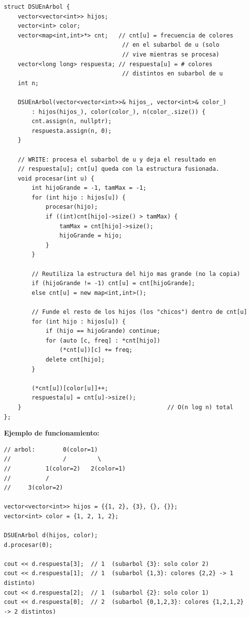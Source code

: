\documentclass[10pt,a4paper,twocolumn]{article}
\begin{document}
\begin{lstlisting}[style=cpp]
struct DSUEnArbol {
    vector<vector<int>> hijos;
    vector<int> color;
    vector<map<int,int>*> cnt;   // cnt[u] = frecuencia de colores
                                  // en el subarbol de u (solo
                                  // vive mientras se procesa)
    vector<long long> respuesta; // respuesta[u] = # colores
                                  // distintos en subarbol de u
    int n;

    DSUEnArbol(vector<vector<int>>& hijos_, vector<int>& color_)
        : hijos(hijos_), color(color_), n(color_.size()) {
        cnt.assign(n, nullptr);
        respuesta.assign(n, 0);
    }

    // WRITE: procesa el subarbol de u y deja el resultado en
    // respuesta[u]; cnt[u] queda con la estructura fusionada.
    void procesar(int u) {
        int hijoGrande = -1, tamMax = -1;
        for (int hijo : hijos[u]) {
            procesar(hijo);
            if ((int)cnt[hijo]->size() > tamMax) {
                tamMax = cnt[hijo]->size();
                hijoGrande = hijo;
            }
        }

        // Reutiliza la estructura del hijo mas grande (no la copia)
        if (hijoGrande != -1) cnt[u] = cnt[hijoGrande];
        else cnt[u] = new map<int,int>();

        // Funde el resto de los hijos (los "chicos") dentro de cnt[u]
        for (int hijo : hijos[u]) {
            if (hijo == hijoGrande) continue;
            for (auto [c, freq] : *cnt[hijo])
                (*cnt[u])[c] += freq;
            delete cnt[hijo];
        }

        (*cnt[u])[color[u]]++;
        respuesta[u] = cnt[u]->size();
    }                                          // O(n log n) total
};
\end{lstlisting}

\textbf{Ejemplo de funcionamiento:}

\begin{lstlisting}[style=cpp]
// arbol:        0(color=1)
//               /         \
//          1(color=2)   2(color=1)
//          /
//     3(color=2)

vector<vector<int>> hijos = {{1, 2}, {3}, {}, {}};
vector<int> color = {1, 2, 1, 2};

DSUEnArbol d(hijos, color);
d.procesar(0);

cout << d.respuesta[3];  // 1  (subarbol {3}: solo color 2)
cout << d.respuesta[1];  // 1  (subarbol {1,3}: colores {2,2} -> 1 distinto)
cout << d.respuesta[2];  // 1  (subarbol {2}: solo color 1)
cout << d.respuesta[0];  // 2  (subarbol {0,1,2,3}: colores {1,2,1,2} -> 2 distintos)
\end{lstlisting}
\end{document}
